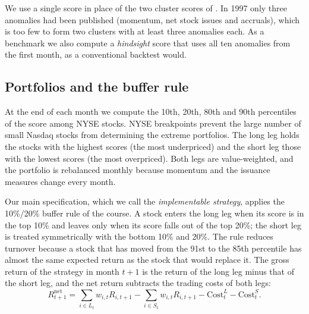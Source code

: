 \documentclass[12pt,a4paper]{article}
\begin{document}
We use a single score in place of the two cluster scores of \citet{stambaugh2017}. In 1997 only three anomalies had been published (momentum, net stock issues and accruals), which is too few to form two clusters with at least three anomalies each. As a benchmark we also compute a \emph{hindsight} score that uses all ten anomalies from the first month, as a conventional backtest would.

\subsection{Portfolios and the buffer rule}
At the end of each month we compute the 10th, 20th, 80th and 90th percentiles of the score among NYSE stocks. NYSE breakpoints prevent the large number of small Nasdaq stocks from determining the extreme portfolios. The long leg holds the stocks with the highest scores (the most underpriced) and the short leg those with the lowest scores (the most overpriced). Both legs are value-weighted, and the portfolio is rebalanced monthly because momentum and the issuance measures change every month.

Our main specification, which we call the \emph{implementable strategy}, applies the 10\%/20\% buffer rule of the course. A stock enters the long leg when its score is in the top 10\% and leaves only when its score falls out of the top 20\%; the short leg is treated symmetrically with the bottom 10\% and 20\%. The rule reduces turnover because a stock that has moved from the 91st to the 85th percentile has almost the same expected return as the stock that would replace it. The gross return of the strategy in month $t+1$ is the return of the long leg minus that of the short leg, and the net return subtracts the trading costs of both legs:
\begin{equation}
R^{\text{net}}_{t+1}=\sum_{i\in L_t}w_{i,t}R_{i,t+1}-\sum_{i\in S_t}w_{i,t}R_{i,t+1}-\text{Cost}^{L}_t-\text{Cost}^{S}_t .
\end{equation}
\end{document}

